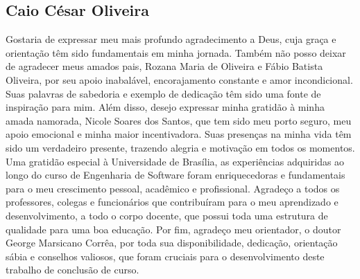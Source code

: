 \begin{agradecimentos}

\subsection*{Caio César Oliveira}

Gostaria de expressar meu mais profundo agradecimento a Deus, cuja graça e orientação têm sido fundamentais em minha jornada. Também não posso deixar de agradecer meus amados pais, Rozana Maria de Oliveira e Fábio Batista Oliveira, por seu apoio inabalável, encorajamento constante e amor incondicional. Suas palavras de sabedoria e exemplo de dedicação têm sido uma fonte de inspiração para mim. 
Além disso, desejo expressar minha gratidão à minha amada namorada, Nicole Soares dos Santos, que tem sido meu porto seguro, meu apoio emocional e minha maior incentivadora. Suas presenças na minha vida têm sido um verdadeiro presente, trazendo alegria e motivação em todos os momentos.
Uma gratidão especial à Universidade de Brasília, as experiências adquiridas ao longo do curso de Engenharia de Software foram enriquecedoras e fundamentais para o meu crescimento pessoal, acadêmico e profissional. Agradeço a todos os professores, colegas e funcionários que contribuíram para o meu aprendizado e desenvolvimento, a todo o corpo docente, que possui toda uma estrutura de qualidade para uma boa educação.
Por fim, agradeço  meu orientador, o doutor George Marsicano Corrêa, por toda sua disponibilidade, dedicação, orientação sábia e conselhos valiosos, que foram cruciais para o desenvolvimento deste trabalho de conclusão de curso.

\end{agradecimentos}
